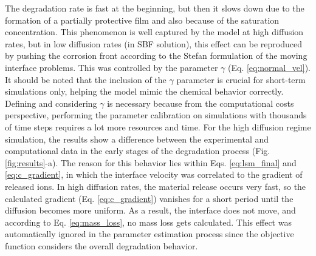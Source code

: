 The degradation rate is fast at the beginning, but then it slows down due to the formation of a partially protective film and also because of the saturation concentration. This phenomenon is well captured by the model at high diffusion rates, but in low diffusion rates (in SBF solution), this effect can be reproduced by pushing the corrosion front according to the Stefan formulation of the moving interface problems. This was controlled by the parameter $\gamma$ (Eq. \ref{eq:normal_vel}).
It should be noted that the inclusion of the $\gamma$ parameter is crucial for short-term simulations only, helping the model mimic the chemical behavior correctly.
Defining and considering  $\gamma$ is necessary because from the computational costs perspective, performing the parameter calibration on simulations with thousands of time steps requires a lot more resources and time. For the high diffusion regime simulation, the results show a difference between the experimental and computational data in the early stages of the degradation process (Fig. \ref{fig:results}-a). The reason for this behavior lies within Eqs. \ref{eq:lsm_final} and \ref{eq:c_gradient}, in which the interface velocity was correlated to the gradient of released ions. In high diffusion rates, the material release occurs very fast, so the calculated gradient (Eq. \ref{eq:c_gradient}) vanishes for a short period until the diffusion becomes more uniform. As a result, the interface does not move, and according to Eq. \ref{eq:mass_loss}, no mass loss gets calculated. This effect was automatically ignored in the parameter estimation process since the objective function considers the overall degradation behavior.


